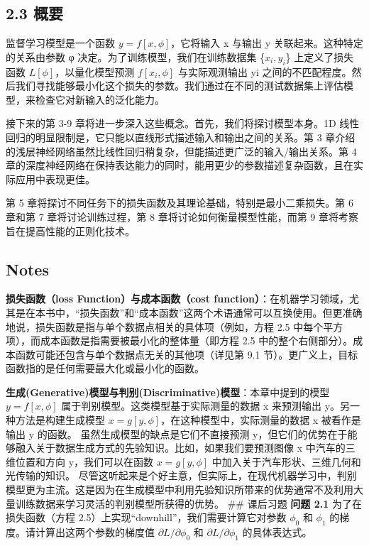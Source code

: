 \documentclass[
]{article}
\begin{document}
\hypertarget{ux6982ux8981}{%
\subsection{2.3 概要}\label{ux6982ux8981}}

监督学习模型是一个函数 \(y = f[x, \phi]\)，它将输入 x 与输出 y
关联起来。这种特定的关系由参数 φ 决定。为了训练模型，我们在训练数据集
\{\(x_i, y_i\)\} 上定义了损失函数 \(L[\phi]\)，以量化模型预测
\(f[x_i,\phi]\) 与实际观测输出 yi
之间的不匹配程度。然后我们寻找能够最小化这个损失的参数。我们通过在不同的测试数据集上评估模型，来检查它对新输入的泛化能力。

接下来的第 3-9 章将进一步深入这些概念。首先，我们将探讨模型本身。1D
线性回归的明显限制是，它只能以直线形式描述输入和输出之间的关系。第 3
章介绍的浅层神经网络虽然比线性回归稍复杂，但能描述更广泛的输入/输出关系。第
4
章的深度神经网络在保持表达能力的同时，能用更少的参数描述复杂函数，且在实际应用中表现更佳。

第 5 章将探讨不同任务下的损失函数及其理论基础，特别是最小二乘损失。第 6
章和第 7 章将讨论训练过程，第 8 章将讨论如何衡量模型性能，而第 9
章将考察旨在提高性能的正则化技术。

\hypertarget{notes}{%
\subsection{Notes}\label{notes}}

\textbf{损失函数（loss Function）与成本函数（cost
function）}：在机器学习领域，尤其是在本书中，``损失函数''和``成本函数''这两个术语通常可以互换使用。但更准确地说，损失函数是指与单个数据点相关的具体项（例如，方程
2.5 中每个平方项），而成本函数是指需要被最小化的整体量（即方程 2.5
中的整个右侧部分）。成本函数可能还包含与单个数据点无关的其他项（详见第
9.1 节）。更广义上，目标函数指的是任何需要最大化或最小化的函数。

\textbf{生成(Generative)模型与判别(Discriminative)模型}：本章中提到的模型
\(y = f[x, \phi]\) 属于判别模型。这类模型基于实际测量的数据 x 来预测输出
y。另一种方法是构建生成模型
\(x = g[y, \phi]\)，在这种模型中，实际测量的数据 x 被看作是输出 y
的函数。 虽然生成模型的缺点是它们不直接预测
y，但它们的优势在于能够融入关于数据生成方式的先验知识。比如，如果我们要预测图像
x 中汽车的三维位置和方向 y，我们可以在函数 \(x = g[y, \phi]\)
中加入关于汽车形状、三维几何和光传输的知识。
尽管这听起来是个好主意，但实际上，在现代机器学习中，判别模型更为主流。这是因为在生成模型中利用先验知识所带来的优势通常不及利用大量训练数据来学习灵活的判别模型所获得的优势。
\#\# 课后习题 \textbf{问题 2.1} 为了在损失函数（方程
2.5）上实现``downhill''，我们需要计算它对参数 \(\phi_0\) 和 \(\phi_1\)
的梯度。请计算出这两个参数的梯度值 \(\partial L / \partial \phi_0\) 和
\(\partial L / \partial \phi_1\) 的具体表达式。
\end{document}
